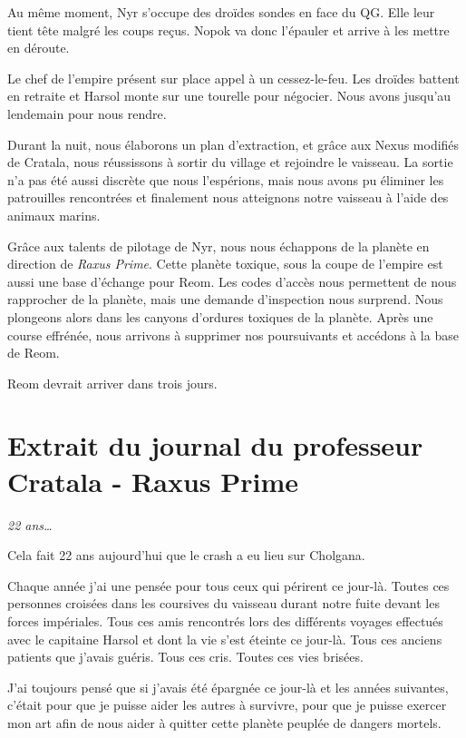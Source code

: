 \documentclass[a4paper,9pt,twoside,twocolumn,openany]{book}
\begin{document}
Au même moment, Nyr s’occupe des droïdes sondes en face du QG. Elle leur tient tête malgré les coups reçus. Nopok va donc l’épauler et arrive à les mettre en déroute.

Le chef de l’empire présent sur place appel à un cessez-le-feu. Les droïdes battent en retraite et Harsol monte sur une tourelle pour négocier. Nous avons jusqu’au lendemain pour nous rendre.

Durant la nuit, nous élaborons un plan d’extraction, et grâce aux Nexus modifiés de Cratala, nous réussissons à sortir du village et rejoindre le vaisseau. La sortie n’a pas été aussi discrète que nous l’espérions, mais nous avons pu éliminer les patrouilles rencontrées et finalement nous atteignons notre vaisseau à l’aide des animaux marins.

Grâce aux talents de pilotage de Nyr, nous nous échappons de la planète en direction de \emph{Raxus Prime}. Cette planète toxique, sous la coupe de l’empire est aussi une base d’échange pour Reom. Les codes d’accès nous permettent de nous rapprocher de la planète, mais une demande d’inspection nous surprend. Nous plongeons alors dans les canyons d’ordures toxiques de la planète. Après une course effrénée, nous arrivons à supprimer nos poursuivants et accédons à la base de Reom.

Reom devrait arriver dans trois jours.

\section{Extrait du journal du professeur Cratala - Raxus Prime}
\subtitle{8 septembre 2017}

\emph{22 ans…}

Cela fait 22 ans aujourd'hui que le crash a eu lieu sur Cholgana. 

Chaque année j’ai une pensée pour tous ceux qui périrent ce jour-là. Toutes ces personnes croisées dans les coursives du vaisseau durant notre fuite devant les forces impériales. Tous ces amis rencontrés lors des différents voyages effectués avec le capitaine Harsol et dont la vie s’est éteinte ce jour-là. Tous ces anciens patients que j’avais guéris. Tous ces cris. Toutes ces vies brisées. 

J’ai toujours pensé que si j’avais été épargnée ce jour-là et les années suivantes, c’était pour que je puisse aider les autres à survivre, pour que je puisse exercer mon art afin de nous aider à quitter cette planète peuplée de dangers mortels.
\end{document}
